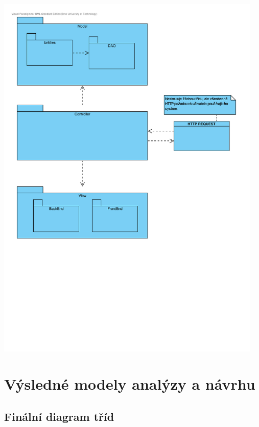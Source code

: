 \documentclass[12pt,a4paper,titlepage,final]{report}
\begin{document}
		\begin{center}
			\captionsetup{type=figure}
			\includegraphics[height=18cm]{img/architektura.pdf}
		\end{center}
		


\chapter{Výsledné modely analýzy a návrhu}

\section{Finální diagram tříd}
		
\end{document}

